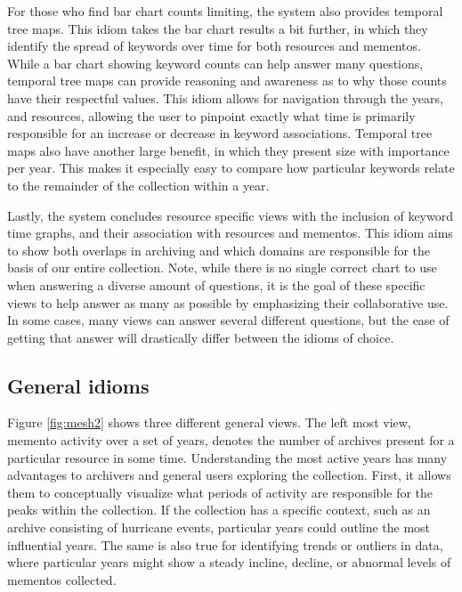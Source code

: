 \documentclass[10pt,journal,compsoc]{IEEEtran}
\begin{document}
For those who find bar chart counts limiting, the system also provides temporal tree maps. This idiom takes the bar chart results a bit further, in which they identify the spread of keywords over time for both resources and mementos. While a bar chart showing keyword counts can help answer many questions, temporal tree maps can provide reasoning and awareness as to why those counts have their respectful values. This idiom allows for navigation through the years, and resources, allowing the user to pinpoint exactly what time is primarily responsible for an increase or decrease in keyword associations. Temporal tree maps also have another large benefit, in which they present size with importance per year. This makes it especially easy to compare how particular keywords relate to the remainder of the collection within a year. \par

Lastly, the system concludes resource specific views with the inclusion of keyword time graphs, and their association with resources and mementos. This idiom aims to show both overlaps in archiving and which domains are responsible for the basis of our entire collection. Note, while there is no single correct chart to use when answering a diverse amount of questions, it is the goal of these specific views to help answer as many as possible by emphasizing their collaborative use. In some cases, many views can answer several different questions, but the ease of getting that answer will drastically differ between the idioms of choice. \par

\subsection{General idioms}
Figure \ref{fig:mesh2} shows three different general views. The left most view, memento activity over a set of years, denotes the number of archives present for a particular resource in some time. Understanding the most active years has many advantages to archivers and general users exploring the collection. First, it allows them to conceptually visualize what periods of activity are responsible for the peaks within the collection. If the collection has a specific context, such as an archive consisting of hurricane events, particular years could outline the most influential years. The same is also true for identifying trends or outliers in data, where particular years might show a steady incline, decline, or abnormal levels of mementos collected. \par
\end{document}
